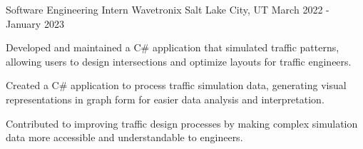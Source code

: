 \begin{cventries}

\cventry
{Software Engineering Intern} %
{Wavetronix} %
{Salt Lake City, UT} %
{March 2022 - January 2023} %
{ %
\begin{cvitems}
\item {Developed and maintained a C\# application that simulated traffic patterns, allowing users to design intersections and optimize layouts for traffic engineers.}
\item {Created a C\# application to process traffic simulation data, generating visual representations in graph form for easier data analysis and interpretation.}
\item {Contributed to improving traffic design processes by making complex simulation data more accessible and understandable to engineers.}
\end{cvitems}
}


\end{cventries}